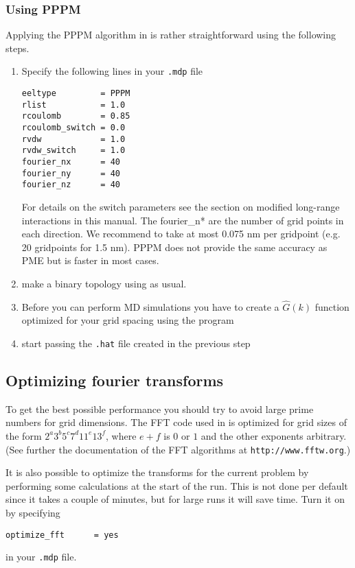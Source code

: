 \subsubsection{Using PPPM}
Applying the PPPM algorithm in {\gromacs} is rather straightforward using the
following steps.
\begin{enumerate}
\item   Specify the following lines in your {\tt .mdp} file
\begin{verbatim}
eeltype         = PPPM
rlist           = 1.0
rcoulomb        = 0.85
rcoulomb_switch = 0.0
rvdw            = 1.0
rvdw_switch     = 1.0
fourier_nx      = 40
fourier_ny      = 40
fourier_nz      = 40
\end{verbatim}
For details on the switch parameters see the section on modified
long-range interactions in this manual. The fourier\_n* are the number of grid points in each direction.
We recommend to take at most 0.075 nm per gridpoint (e.g. 20 gridpoints for 1.5 nm).
PPPM does not provide the same accuracy as PME but is faster in most
cases.

\item   make a binary topology using {\tt{}} as usual. 
\item   Before you can perform MD simulations you have to create a 
        $\hat{G}(k)$ function optimized for your grid spacing using the
        {\tt{}} program
\item   start {\tt{}} passing the {\tt .hat} file created in the
        previous step
\end{enumerate}

\subsection{Optimizing fourier transforms}
To get the best possible performance you should try to avoid large
prime numbers for grid dimensions.
The FFT code used in {\gromacs} is
optimized for grid sizes of the form $2^a 3^b 5^c 7^d 11^e 13^f$,
where $e+f$ is $0$ or $1$ and the other exponents arbitrary. (See
further the documentation of the FFT algorithms at {\tt http://www.fftw.org}.)

It is also possible to optimize the transforms for the current problem
by performing some calculations at the start of the run. This is not
done per default since it takes a couple of minutes, but for large
runs it will save time. Turn it on by specifying

\begin{verbatim}
optimize_fft      = yes
\end{verbatim}
in your {\tt .mdp} file.

